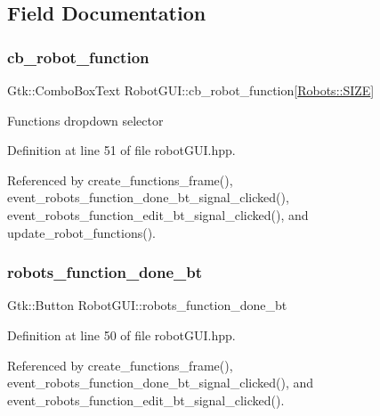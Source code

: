 \subsection{Field Documentation}
\mbox{\label{class_robot_g_u_i_ab1e977d6ae4bcf57e4306f017695eeeb}} 
\subsubsection{\texorpdfstring{cb\+\_\+robot\+\_\+function}{cb\_robot\_function}}
{\footnotesize\ttfamily Gtk\+::\+Combo\+Box\+Text Robot\+G\+U\+I\+::cb\+\_\+robot\+\_\+function\mbox{[}\hyperlink{class_robots_ae9df2f1d345ad6740f0459956cdd4712}{Robots\+::\+S\+I\+ZE}\mbox{]}\hspace{0.3cm}{\ttfamily [private]}}

Functions dropdown selector 

Definition at line 51 of file robot\+G\+U\+I.\+hpp.



Referenced by create\+\_\+functions\+\_\+frame(), event\+\_\+robots\+\_\+function\+\_\+done\+\_\+bt\+\_\+signal\+\_\+clicked(), event\+\_\+robots\+\_\+function\+\_\+edit\+\_\+bt\+\_\+signal\+\_\+clicked(), and update\+\_\+robot\+\_\+functions().

\mbox{\label{class_robot_g_u_i_a17db9c0ad94bd601734b87c6aff3fcf0}} 
\subsubsection{\texorpdfstring{robots\+\_\+function\+\_\+done\+\_\+bt}{robots\_function\_done\_bt}}
{\footnotesize\ttfamily Gtk\+::\+Button Robot\+G\+U\+I\+::robots\+\_\+function\+\_\+done\+\_\+bt\hspace{0.3cm}{\ttfamily [private]}}



Definition at line 50 of file robot\+G\+U\+I.\+hpp.



Referenced by create\+\_\+functions\+\_\+frame(), event\+\_\+robots\+\_\+function\+\_\+done\+\_\+bt\+\_\+signal\+\_\+clicked(), and event\+\_\+robots\+\_\+function\+\_\+edit\+\_\+bt\+\_\+signal\+\_\+clicked().

